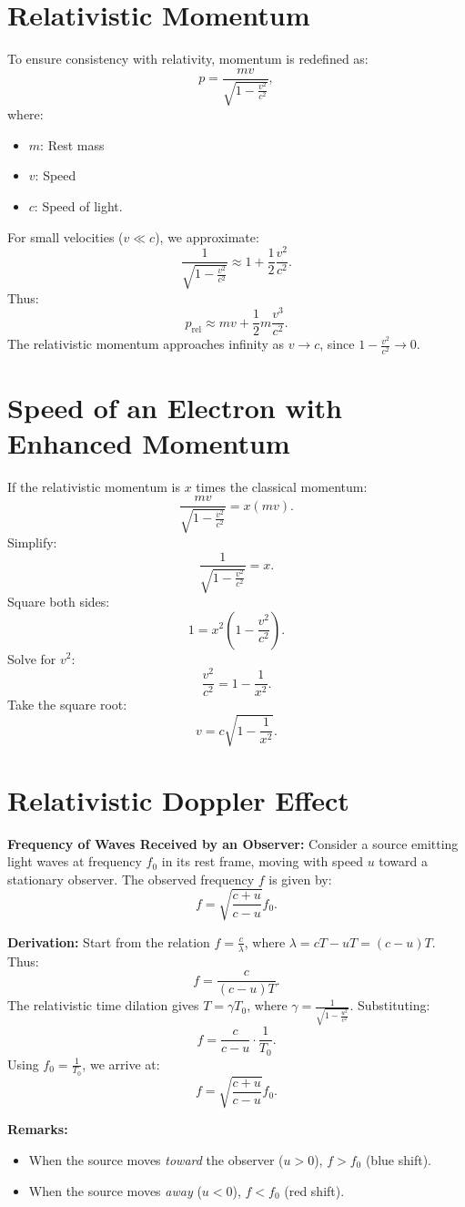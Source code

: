 \documentclass[a4paper,12pt]{article}
\begin{document}
\begin{multicols}{2}
\section*{Relativistic Momentum}
To ensure consistency with relativity, momentum is redefined as:
\[
p = \frac{m v}{\sqrt{1 - \frac{v^2}{c^2}}},
\]
where:
\begin{itemize}
    \item \(m\): Rest mass
    \item \(v\): Speed
    \item \(c\): Speed of light.
\end{itemize}

For small velocities (\(v \ll c\)), we approximate:
\[
\frac{1}{\sqrt{1 - \frac{v^2}{c^2}}} \approx 1 + \frac{1}{2}\frac{v^2}{c^2}.
\]
Thus:
\[
p_{\text{rel}} \approx m v + \frac{1}{2}m\frac{v^3}{c^2}.
\]
The relativistic momentum approaches infinity as \(v \to c\), since \(1 - \frac{v^2}{c^2} \to 0\).

\section*{Speed of an Electron with Enhanced Momentum}
If the relativistic momentum is \(x\) times the classical momentum:
\[
\frac{mv}{\sqrt{1 - \frac{v^2}{c^2}}} = x(mv).
\]
Simplify:
\[
\frac{1}{\sqrt{1 - \frac{v^2}{c^2}}} = x.
\]
Square both sides:
\[
1 = x^2(1 - \frac{v^2}{c^2}).
\]
Solve for \(v^2\):
\[
\frac{v^2}{c^2} = 1 - \frac{1}{x^2}.
\]
Take the square root:
\[
v = c\sqrt{1 - \frac{1}{x^2}}.
\]

\section*{Relativistic Doppler Effect}
\textbf{Frequency of Waves Received by an Observer:}  
Consider a source emitting light waves at frequency \(f_0\) in its rest frame, moving with speed \(u\) toward a stationary observer. The observed frequency \(f\) is given by:
\[
f = \sqrt{\frac{c+u}{c-u}}f_0.
\]

\textbf{Derivation:}
Start from the relation \(f = \frac{c}{\lambda}\), where \(\lambda = cT - uT = (c-u)T\). Thus:
\[
f = \frac{c}{(c-u)T}.
\]
The relativistic time dilation gives \(T = \gamma T_0\), where \(\gamma = \frac{1}{\sqrt{1 - \frac{u^2}{c^2}}}\). Substituting:
\[
f = \frac{c}{c-u}\cdot\frac{1}{T_0}.
\]
Using \(f_0 = \frac{1}{T_0}\), we arrive at:
\[
f = \sqrt{\frac{c+u}{c-u}}f_0.
\]

\textbf{Remarks:}
\begin{itemize}
    \item When the source moves \textit{toward} the observer (\(u > 0\)), \(f > f_0\) (blue shift).
    \item When the source moves \textit{away} (\(u < 0\)), \(f < f_0\) (red shift).
\end{itemize}

\end{multicols}
\end{document}
